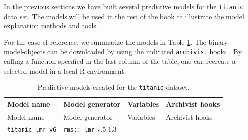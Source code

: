 \documentclass[12pt,]{krantz}
\theoremstyle{definition}
\theoremstyle{definition}
\theoremstyle{definition}
\theoremstyle{remark}
\begin{document}
In the previous sections we have built several predictive models for the
\texttt{titanic} data set. The models will be used in the rest of the
book to illustrate the model explanation methods and tools.

For the ease of reference, we summarize the models in Table
\ref{tab:archivistHooksOfModelsTitanic}. The binary model-objects can be
downloaded by using the indicated \texttt{archivist} hooks
\citep{archivist}. By calling a function specified in the last column of
the table, one can recreate a selected model in a local R environment.

\begin{longtable}[]{@{}llll@{}}
\caption{\label{tab:archivistHooksOfModelsTitanic} Predictive models created
for the \texttt{titanic} dataset.}\tabularnewline
\toprule
\begin{minipage}[b]{0.21\columnwidth}\raggedright
Model name\strut
\end{minipage} & \begin{minipage}[b]{0.25\columnwidth}\raggedright
Model generator\strut
\end{minipage} & \begin{minipage}[b]{0.18\columnwidth}\raggedright
Variables\strut
\end{minipage} & \begin{minipage}[b]{0.25\columnwidth}\raggedright
Archivist hooks\strut
\end{minipage}\tabularnewline
\midrule
\endfirsthead
\toprule
\begin{minipage}[b]{0.21\columnwidth}\raggedright
Model name\strut
\end{minipage} & \begin{minipage}[b]{0.25\columnwidth}\raggedright
Model generator\strut
\end{minipage} & \begin{minipage}[b]{0.18\columnwidth}\raggedright
Variables\strut
\end{minipage} & \begin{minipage}[b]{0.25\columnwidth}\raggedright
Archivist hooks\strut
\end{minipage}\tabularnewline
\midrule
\endhead
\begin{minipage}[t]{0.21\columnwidth}\raggedright
\texttt{titanic\_lmr\_v6}\strut
\end{minipage} & \begin{minipage}[t]{0.25\columnwidth}\raggedright
\texttt{rms::\ lmr} v.5.1.3\strut
\end{minipage} & \begin{minipage}[t]{0.18\columnwidth}\raggedright

\end{minipage}
\end{longtable}
\end{document}
